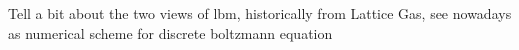 
Tell a bit about the two views of lbm, historically from Lattice Gas, see nowadays as numerical scheme for discrete boltzmann equation
